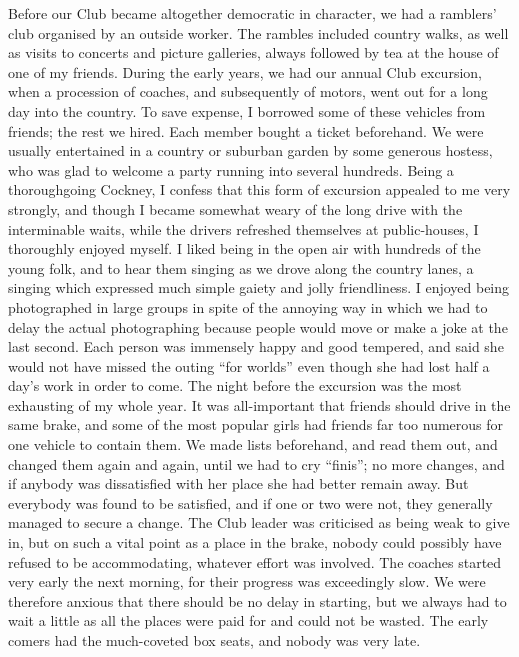 Before our Club became altogether democratic in
character, we had a ramblers’ club organised by an
outside worker. The rambles included country walks, as well
as visits to concerts and picture galleries, always followed
by tea at the house of one of my friends. During the early
years, we had our annual Club excursion, when a
procession of coaches, and subsequently of motors, went out
for a long day into the country. To save expense, I
borrowed some of these vehicles from friends; the rest we
hired. Each member bought a ticket beforehand. We
were usually entertained in a country or suburban garden
by some generous hostess, who was glad to welcome a
party running into several hundreds. Being a thoroughgoing
Cockney, I confess that this form of excursion
appealed to me very strongly, and though I became
somewhat weary of the long drive with the interminable waits,
while the drivers refreshed themselves at public-houses, I
thoroughly enjoyed myself. I liked being in the open air
with hundreds of the young folk, and to hear them
singing as we drove along the country lanes, a singing which
expressed much simple gaiety and jolly friendliness.
I enjoyed being photographed in large groups in spite of
the annoying way in which we had to delay the
actual photographing because people would move or
make a joke at the last second. Each person was
immensely happy and good tempered, and said she would
not have missed the outing “for worlds” even though she
had lost half a day’s work in order to come. The night
before the excursion was the most exhausting of my whole
year. It was all-important that friends should drive in
the same brake, and some of the most popular girls had
friends far too numerous for one vehicle to contain them.
We made lists beforehand, and read them out, and
changed them again and again, until we had to cry
“finis”; no more changes, and if anybody was dissatisfied
with her place she had better remain away. But
everybody was found to be satisfied, and if one or two
were not, they generally managed to secure a change. The
Club leader was criticised as being weak to give in, but on
such a vital point as a place in the brake, nobody could
possibly have refused to be accommodating, whatever
effort was involved. The coaches started very early the
next morning, for their progress was exceedingly slow. We
were therefore anxious that there should be no delay in
starting, but we always had to wait a little as all the
places were paid for and could not be wasted. The early
comers had the much-coveted box seats, and nobody was
very late.

